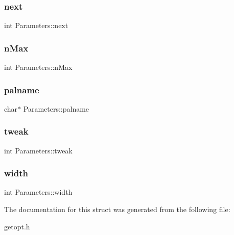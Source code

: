 \subsubsection{\texorpdfstring{next}{next}}
{\footnotesize\ttfamily int Parameters\+::next}

\mbox{\label{struct_parameters_a2e909688b271cc9c2bdb3d0cc9c34269}} 
\subsubsection{\texorpdfstring{n\+Max}{nMax}}
{\footnotesize\ttfamily int Parameters\+::n\+Max}

\mbox{\label{struct_parameters_af435d3291ff1a66552d9f3383c6a517c}} 
\subsubsection{\texorpdfstring{palname}{palname}}
{\footnotesize\ttfamily char$\ast$ Parameters\+::palname}

\mbox{\label{struct_parameters_a1962cf70d9f60c9b1b6d567a0152776b}} 
\subsubsection{\texorpdfstring{tweak}{tweak}}
{\footnotesize\ttfamily int Parameters\+::tweak}

\mbox{\label{struct_parameters_ae8f341732b04b09c84f67f0439efb79d}} 
\subsubsection{\texorpdfstring{width}{width}}
{\footnotesize\ttfamily int Parameters\+::width}



The documentation for this struct was generated from the following file\+:\begin{DoxyCompactItemize}
\item 
getopt.\+h\end{DoxyCompactItemize}
